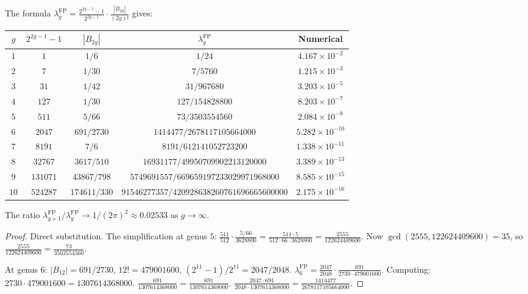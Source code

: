 \begin{computation}
The formula $\lambda_g^{\mathrm{FP}} = \frac{2^{2g-1}-1}{2^{2g-1}} \cdot \frac{|B_{2g}|}{(2g)!}$ gives:
\begin{center}
\renewcommand{\arraystretch}{1.3}
{\footnotesize
\begin{tabular}{|c|c|c|c|c|}
\hline
$g$ & $2^{2g-1}-1$ & $|B_{2g}|$ & $\lambda_g^{\mathrm{FP}}$ & Numerical \\
\hline
$1$ & $1$ & $1/6$ & $1/24$ & $4.167 \times 10^{-2}$ \\
$2$ & $7$ & $1/30$ & $7/5760$ & $1.215 \times 10^{-3}$ \\
$3$ & $31$ & $1/42$ & $31/967680$ & $3.203 \times 10^{-5}$ \\
$4$ & $127$ & $1/30$ & $127/154828800$ & $8.203 \times 10^{-7}$ \\
$5$ & $511$ & $5/66$ & $73/3503554560$ & $2.084 \times 10^{-8}$ \\
$6$ & $2047$ & $691/2730$ & $1414477/2678117105664000$ & $5.282 \times 10^{-10}$ \\
$7$ & $8191$ & $7/6$ & $8191/612141052723200$ & $1.338 \times 10^{-11}$ \\
$8$ & $32767$ & $3617/510$ & $16931177/49950709902213120000$ & $3.389 \times 10^{-13}$ \\
$9$ & $131071$ & $43867/798$ & $5749691557/669659197233029971968000$ & $8.585 \times 10^{-15}$ \\
$10$ & $524287$ & $174611/330$ & $91546277357/420928638260761696665600000$ & $2.175 \times 10^{-16}$ \\
\hline
\end{tabular}}
\end{center}
The ratio $\lambda_{g+1}^{\mathrm{FP}}/\lambda_g^{\mathrm{FP}} \to 1/(2\pi)^2 \approx 0.02533$ as $g \to \infty$.
\end{computation}

\begin{proof}
Direct substitution. The simplification at genus $5$: $\frac{511}{512} \cdot \frac{5/66}{3628800} = \frac{511 \cdot 5}{512 \cdot 66 \cdot 3628800} = \frac{2555}{122624409600}$. Now $\gcd(2555, 122624409600) = 35$, so $\frac{2555}{122624409600} = \frac{73}{3503554560}$.

At genus $6$: $|B_{12}| = 691/2730$, $12! = 479001600$, $(2^{11}-1)/2^{11} = 2047/2048$. $\lambda_6^{\mathrm{FP}} = \frac{2047}{2048} \cdot \frac{691}{2730 \cdot 479001600}$. Computing: $2730 \cdot 479001600 = 1307614368000$. $\frac{691}{1307614368000} = \frac{691}{1307614368000}$. $\frac{2047 \cdot 691}{2048 \cdot 1307614368000} = \frac{1414477}{2678117105664000}$.
\end{proof}


